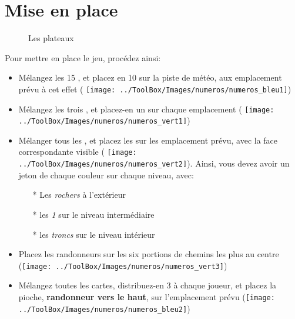 \section*{Mise en place}
\begin{figure}[h]%
    \qquad
    \caption{Les plateaux}%
    \label{fig:plateaux}%
\end{figure}
\FloatBarrier
    
Pour mettre en place le jeu, procédez ainsi:
\begin{itemize}
\item Mélangez les 15 \jetonsMeteo, et placez en 10 sur la piste de météo, aux emplacement prévu à cet effet ( \texttt{[image: ../ToolBox/Images/numeros/numeros\_bleu1]})
\item Mélangez les trois \marqueursObstacles, et placez-en un sur chaque emplacement ( \texttt{[image: ../ToolBox/Images/numeros/numeros\_vert1]})
\item Mélanger tous les \jetonsObstacles, et placez les sur les emplacement prévu, avec la face correspondante visible ( \texttt{[image: ../ToolBox/Images/numeros/numeros\_vert2]}). Ainsi, vous devez avoir un jeton de chaque couleur sur chaque niveau, avec:
\begin{itemize}
\item[*] Les \textit{rochers} à l'extérieur
\item[*] les \textit{1} sur le niveau intermédiaire
\item[*] les \textit{troncs} sur le niveau intérieur
\end{itemize}
\item Placez les randonneurs sur les six portions de chemins les plus au centre (\texttt{[image: ../ToolBox/Images/numeros/numeros\_vert3]})
\item Mélangez toutes les cartes, distribuez-en 3 à chaque joueur, et placez la pioche, \textbf{randonneur vers le haut}, sur l'emplacement prévu (\texttt{[image: ../ToolBox/Images/numeros/numeros\_bleu2]})
\end{itemize}
\FloatBarrier

